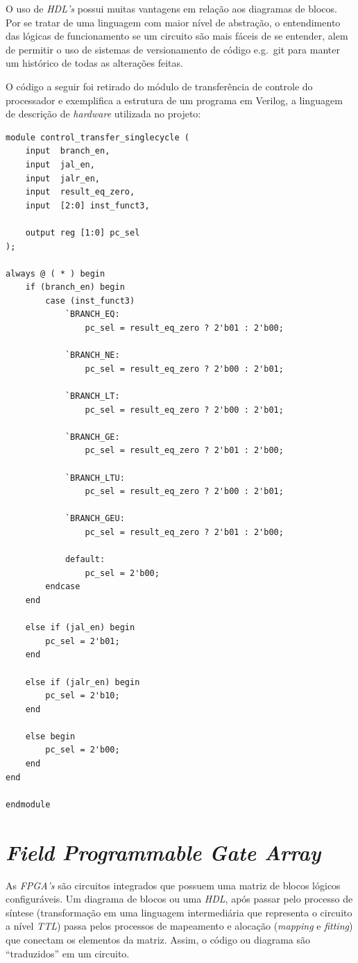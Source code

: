 {
    O uso de \textit{HDL's} possui muitas vantagens em relação aos diagramas de
    blocos. Por se tratar de uma linguagem com maior nível de abstração, o
    entendimento das lógicas de funcionamento se um circuito são mais fáceis de
    se entender, alem de permitir o uso de sistemas de versionamento de código
    e.g.\ git para manter um histórico de todas as alterações feitas.
}

{
    O código a seguir foi retirado do módulo de transferência de controle do 
    processador e exemplifica a estrutura de um programa em Verilog, a 
    linguagem de descrição de \textit{hardware} utilizada no projeto:
}

\begin{lstlisting}[style={verilog-style}]
module control_transfer_singlecycle (
    input  branch_en,
    input  jal_en,
    input  jalr_en,
    input  result_eq_zero,
    input  [2:0] inst_funct3,

    output reg [1:0] pc_sel
);

always @ ( * ) begin
    if (branch_en) begin
        case (inst_funct3)
            `BRANCH_EQ:
                pc_sel = result_eq_zero ? 2'b01 : 2'b00;

            `BRANCH_NE:
                pc_sel = result_eq_zero ? 2'b00 : 2'b01;

            `BRANCH_LT:
                pc_sel = result_eq_zero ? 2'b00 : 2'b01;

            `BRANCH_GE:
                pc_sel = result_eq_zero ? 2'b01 : 2'b00;

            `BRANCH_LTU:
                pc_sel = result_eq_zero ? 2'b00 : 2'b01;

            `BRANCH_GEU:
                pc_sel = result_eq_zero ? 2'b01 : 2'b00;

            default:
                pc_sel = 2'b00;
        endcase
    end

    else if (jal_en) begin
        pc_sel = 2'b01;
    end

    else if (jalr_en) begin
        pc_sel = 2'b10;
    end

    else begin
        pc_sel = 2'b00;
    end
end

endmodule

\end{lstlisting}

\section{\textit{Field Programmable Gate Array}}
{
    As \textit{FPGA's} são circuitos integrados que possuem uma matriz de
    blocos lógicos configuráveis. Um diagrama de blocos ou uma \textit{HDL},
    após passar pelo processo de síntese (transformação em uma linguagem
    intermediária que representa o circuito a nível \textit{TTL}) passa pelos
    processos de mapeamento e alocação (\textit{mapping} e \textit{fitting})
    que conectam os elementos da matriz. Assim, o código ou diagrama são
    ``traduzidos'' em um circuito.
}

